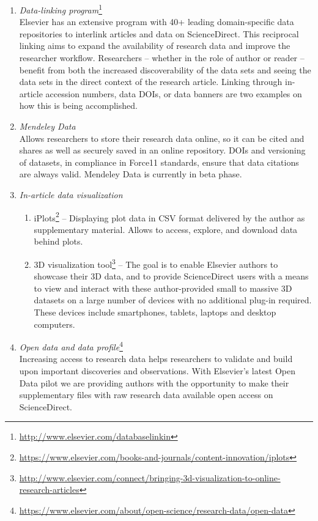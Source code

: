 \documentclass[a4paper,USenglish]{dagrep}
\begin{document}
\begin{enumerate}
\item \emph{Data-linking program}\footnote{\url{http://www.elsevier.com/databaselinkin}}\\
Elsevier has an extensive program with 40+ leading domain-specific data repositories to interlink articles and data on ScienceDirect. This reciprocal linking aims to expand the availability of research data and improve the researcher workflow. Researchers – whether in the role of author or reader – benefit from both the increased discoverability of the data sets and seeing the data sets in the direct context of the research article. Linking through in-article accession numbers, data DOIs, or data banners are two examples on how this is being accomplished.
\item \emph{Mendeley Data}\\
Allows researchers to store their research data online, so it can be cited and shares as well as securely saved in an online repository. DOIs and versioning of datasets, in compliance in Force11 standards, ensure that data citations are always valid. Mendeley Data is currently in beta phase.
\item \emph{In-article data visualization}
  \begin{enumerate}
  \item iPlots\footnote{\url{https://www.elsevier.com/books-and-journals/content-innovation/iplots}} – Displaying plot data in CSV format delivered by the author as supplementary material. Allows to access, explore, and download data behind plots.
  \item 3D visualization tool\footnote{\url{http://www.elsevier.com/connect/bringing-3d-visualization-to-online-research-articles}} – The goal is to enable Elsevier authors to showcase their 3D data, and to provide ScienceDirect users with a means to view and interact with these author-provided small to massive 3D datasets on a large number of devices with no additional plug-in required. These devices include smartphones, tablets, laptops and desktop computers.
  \end{enumerate}
\item \emph{Open data and data profile}\footnote{\url{https://www.elsevier.com/about/open-science/research-data/open-data}}\\ Increasing access to research data helps researchers to validate and build upon important discoveries and observations. With Elsevier's latest Open Data pilot we are providing authors with the opportunity to make their supplementary files with raw research data available open access on ScienceDirect.

\end{enumerate}
\end{document}
